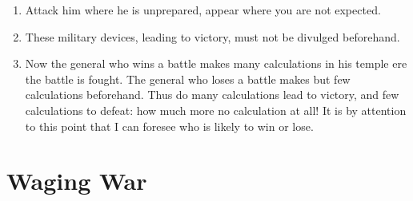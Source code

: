 \documentclass[oneside]{book}
\begin{document}
\begin{enumerate}
	\item Attack him where he is unprepared, appear where you are not expected.
	\item These military devices, leading to victory, must not be divulged beforehand.
	\item Now the general who wins a battle makes many calculations in his temple ere the battle is fought. The general who loses a battle makes but few calculations beforehand. Thus do many calculations lead to victory, and few calculations to defeat: how much more no calculation at all! It is by attention to this point that I can foresee who is likely to win or lose.
\end{enumerate}

\chapter{Waging War}
\end{document}
